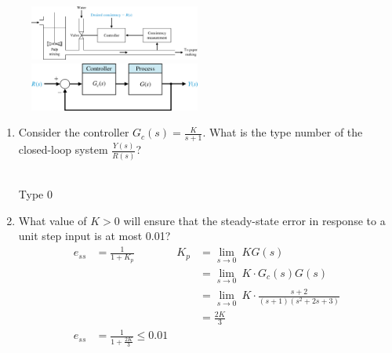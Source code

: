 \documentclass[11pt]{article}
\begin{document}
\begin{enumerate}
        \begin{figure}[h!]
        \includegraphics[width=0.5\textwidth]{./Images/Fig04-003.png}
        \includegraphics[width=0.5\textwidth]{./Images/Fig04-004.png}
        \end{figure}
        \begin{enumerate}
            \item Consider the controller \( G_c(s) = \displaystyle \frac{K}{s+1} \). What is the type number of the closed-loop system \(\frac{Y(s)}{R(s)}\)?
            \begin{center}
                \\Type 0
            \end{center}\newpage
            \item What value of \( K > 0 \) will ensure that the steady-state error in response to a unit step input is at most 0.01?
            \begin{align*}
                e_{ss} &=\frac{1}{1+K_p} &K_p &= \lim_{s \to 0}\ KG(s)\\
                &&&=\lim_{s \to 0}\ K\cdot G_c(s)G(s)\\
                &&&=\lim_{s \to 0}\ K\cdot \frac{s+2}{(s+1)(s^2+2s+3)}\\
                &&&=\frac{2K}{3}\\
                e_{ss} &=\frac{1}{1+\displaystyle\frac{2K}{3}}\leq 0.01\\ \\

\end{align*}
\end{enumerate}
\end{enumerate}
\end{document}
